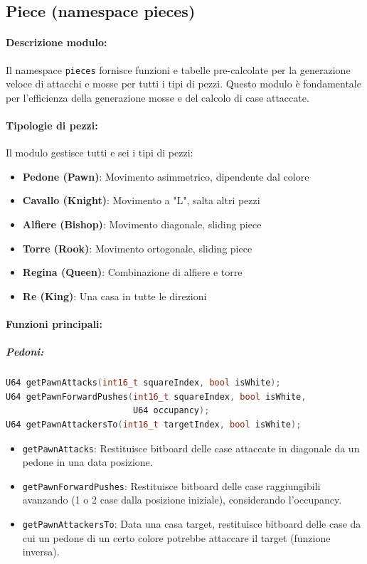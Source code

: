 \subsection{Piece (namespace pieces)}
\paragraph{Descrizione modulo:}
Il namespace \texttt{pieces} fornisce funzioni e tabelle pre-calcolate per la generazione
veloce di attacchi e mosse per tutti i tipi di pezzi. Questo modulo è fondamentale per
l'efficienza della generazione mosse e del calcolo di case attaccate.

\paragraph{Tipologie di pezzi:}
Il modulo gestisce tutti e sei i tipi di pezzi:
\begin{itemize}
  \item \textbf{Pedone (Pawn)}: Movimento asimmetrico, dipendente dal colore
  \item \textbf{Cavallo (Knight)}: Movimento a "L", salta altri pezzi
  \item \textbf{Alfiere (Bishop)}: Movimento diagonale, sliding piece
  \item \textbf{Torre (Rook)}: Movimento ortogonale, sliding piece
  \item \textbf{Regina (Queen)}: Combinazione di alfiere e torre
  \item \textbf{Re (King)}: Una casa in tutte le direzioni
\end{itemize}

\paragraph{Funzioni principali:}

\subparagraph{Pedoni:}
\begin{lstlisting}[language=C++]
U64 getPawnAttacks(int16_t squareIndex, bool isWhite);
U64 getPawnForwardPushes(int16_t squareIndex, bool isWhite,
                         U64 occupancy);
U64 getPawnAttackersTo(int16_t targetIndex, bool isWhite);
\end{lstlisting}

\begin{itemize}
  \item \texttt{getPawnAttacks}: Restituisce bitboard delle case attaccate in diagonale
        da un pedone in una data posizione.
  \item \texttt{getPawnForwardPushes}: Restituisce bitboard delle case raggiungibili
        avanzando (1 o 2 case dalla posizione iniziale), considerando l'occupancy.
  \item \texttt{getPawnAttackersTo}: Data una casa target, restituisce bitboard delle
        case da cui un pedone di un certo colore potrebbe attaccare il target (funzione inversa).
\end{itemize}

